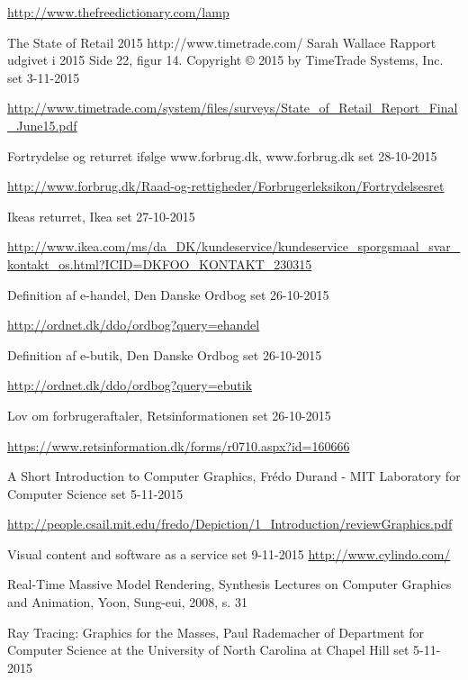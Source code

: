 \begin{thebibliography}{99}
  \url{http://www.thefreedictionary.com/lamp}

  The State of Retail 2015
  http://www.timetrade.com/
  Sarah Wallace
  Rapport udgivet i 2015
  Side 22, figur 14.
  Copyright © 2015 by TimeTrade Systems, Inc.
  set 3-11-2015
  
  \url{http://www.timetrade.com/system/files/surveys/State_of_Retail_Report_Final_June15.pdf}

  Fortrydelse og returret ifølge www.forbrug.dk,
  www.forbrug.dk
  set 28-10-2015
  
  \url{http://www.forbrug.dk/Raad-og-rettigheder/Forbrugerleksikon/Fortrydelsesret}

  Ikeas returret,
  Ikea
  set 27-10-2015
  
  \url{http://www.ikea.com/ms/da_DK/kundeservice/kundeservice_sporgsmaal_svar_kontakt_os.html?ICID=DKFOO_KONTAKT_230315}
  
  Definition af e-handel,
  Den Danske Ordbog
  set 26-10-2015
 
  \url{http://ordnet.dk/ddo/ordbog?query=ehandel}

  Definition af e-butik,
  Den Danske Ordbog
  set 26-10-2015
  
  \url{http://ordnet.dk/ddo/ordbog?query=ebutik}

  Lov om forbrugeraftaler,
  Retsinformationen
  set 26-10-2015
  
  \url{https://www.retsinformation.dk/forms/r0710.aspx?id=160666}

  A Short Introduction to Computer Graphics,
  Frédo Durand - MIT Laboratory for Computer Science
  set 5-11-2015

  \url{http://people.csail.mit.edu/fredo/Depiction/1_Introduction/reviewGraphics.pdf}
  
  Visual content and software as a service
  set 9-11-2015
  \url{http://www.cylindo.com/}
  
  Real-Time Massive Model Rendering,
  Synthesis Lectures on Computer Graphics and Animation,
  Yoon, Sung-eui, 2008,
  s. 31

  Ray Tracing: Graphics for the Masses, 
  Paul Rademacher of Department for Computer Science at the University of North Carolina at Chapel Hill
  set 5-11-2015


\end{thebibliography}
